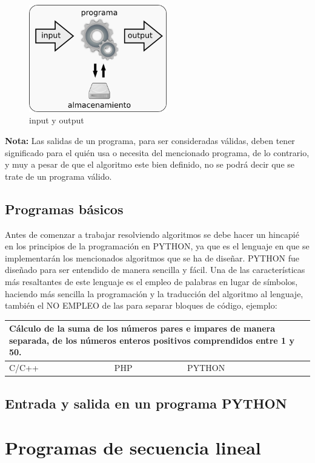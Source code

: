 \documentclass[12pt, a4paper]{article}
\begin{document}
\newpage

\begin{figure}
	\centering
	\includegraphics[width = 6cm]{Figuras/input y output.png}
	\caption{input y output}
	\label{i_o}
\end{figure}

\textbf{Nota:} Las salidas de un programa, para ser consideradas válidas, deben tener significado para el quién usa o necesita del mencionado programa, de lo contrario, y muy a pesar de que el algoritmo este bien definido, no se podrá decir que se trate de un programa válido.

\subsection{Programas básicos}
Antes de comenzar a trabajar resolviendo algoritmos se
debe hacer un hincapié en los principios de la programación en PYTHON, ya que es el lenguaje en que se implementarán los mencionados algoritmos que se ha de diseñar. PYTHON fue diseñado para ser entendido de manera sencilla y fácil. Una de las características más resaltantes de este lenguaje es el empleo de palabras en lugar de símbolos, haciendo más sencilla la programación y la traducción del algoritmo al lenguaje, también el NO EMPLEO de las para separar bloques de código, ejemplo:

\begin{table}[h!]
	\centering
	\begin{tabular}{|lll|}
	\hline 
	\multicolumn{3}{|p{342.5297pt}|}{\centering Cálculo de la suma de los números pares e impares de manera separada, de los números enteros positivos comprendidos entre 1 y 50.}\\ 
	\hline 
	\multicolumn{1}{|p{114.4275pt}}{\multirow [t]{3}{=}{\centering C/C++}} & \multicolumn{1}{|p{114.4275pt}}{\multirow [t]{3}{=}{\centering PHP}} & \multicolumn{1}{|p{113.67469pt}|}{\multirow [t]{3}{=}{\centering PYTHON}}\\ 
	
	\multicolumn{1}{|l}{} & \multicolumn{1}{|l}{} & \multicolumn{1}{|l|}{}\\ 
	
	\multicolumn{1}{|l}{} & \multicolumn{1}{|l}{} & \multicolumn{1}{|l|}{}\\ 
	\hline 
	
	\end{tabular}
\end{table}

\subsection{Entrada y salida en un programa PYTHON}

\section{Programas de secuencia lineal}
\end{document}
